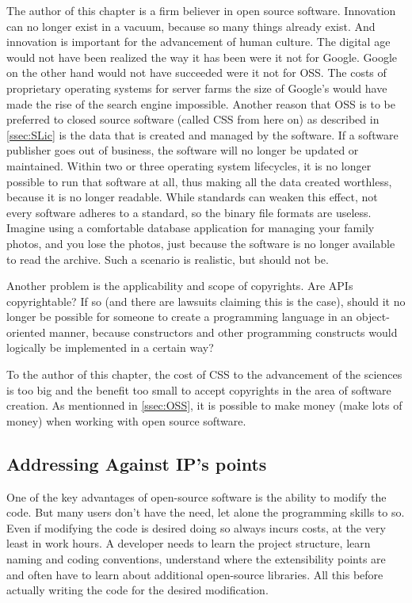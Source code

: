 \documentclass[a4paper]{report}
\begin{document}
The author of this chapter is a firm believer in open source software. Innovation can no longer exist in a vacuum, because so many things already exist. And innovation is important for the advancement of human culture. The digital age would not have been realized the way it has been were it not for Google. Google on the other hand would not have succeeded were it not for OSS. The costs of proprietary operating systems for server farms the size of Google's would have made the rise of the search engine impossible. Another reason that OSS is to be preferred to closed source software (called CSS from here on) as described in \ref{ssec:SLic} is the data that is created and managed by the software. If a software publisher goes out of business, the software will no longer be updated or maintained. Within two or three operating system lifecycles, it is no longer possible to run that software at all, thus making all the data created worthless, because it is no longer readable. While standards can weaken this effect, not every software adheres to a standard, so the binary file formats are useless. Imagine using a comfortable database application for managing your family photos, and you lose the photos, just because the software is no longer available to read the archive. Such a scenario is realistic, but should not be.

Another problem is the applicability and scope of copyrights. Are APIs copyrightable? If so (and there are lawsuits claiming this is the case), should it no longer be possible for someone to create a programming language in an object-oriented manner, because constructors and other programming constructs would logically be implemented in a certain way? 

To the author of this chapter, the cost of CSS to the advancement of the sciences is too big and the benefit too small to accept copyrights in the area of software creation. As mentionned in \ref{ssec:OSS}, it is possible to make money (make lots of money) when working with open source software.

\subsection{Addressing Against IP's points}
One of the key advantages of open-source software is the ability to modify the code. But many users don't have the need, let alone the programming skills to so. Even if modifying the code is desired doing so always incurs costs, at the very least in work hours. A developer needs to learn the project structure, learn naming and coding conventions, understand where the extensibility points are and often have to learn about additional open-source libraries. All this before actually writing the code for the desired modification. 
\end{document}
